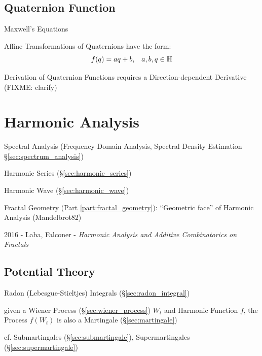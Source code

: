 \subsection{Quaternion Function}\label{sec:quaternion_function}

Maxwell's Equations

Affine Transformations of Quaternions have the form:
\[
  f(q) = aq + b, \;\;\; a,b,q \in \mathbb{H}
\]

Derivation of Quaternion Functions requires a Direction-dependent Derivative
(FIXME: clarify)



\section{Harmonic Analysis}\label{sec:harmonic_analysis}

\fist Spectral Analysis (Frequency Domain Analysis, Spectral Density Estimation
\S\ref{sec:spectrum_analysis})

\fist Harmonic Series (\S\ref{sec:harmonic_series})

\fist Harmonic Wave (\S\ref{sec:harmonic_wave})

\fist Fractal Geometry (Part \ref{part:fractal_geometry}): ``Geometric face'' of
Harmonic Analysis (Mandelbrot82)

2016 - Laba, Falconer - \emph{Harmonic Analysis and Additive Combinatorics on
  Fractals}



\subsection{Potential Theory}\label{sec:potential_theory}

Radon (Lebesgue-Stieltjes) Integrals (\S\ref{sec:radon_integral})

given a Wiener Process (\S\ref{sec:wiener_process}) $W_t$ and Harmonic Function
$f$, the Process $f(W_t)$ is also a Martingale (\S\ref{sec:martingale})

\fist cf. Submartingales (\S\ref{sec:submartingale}), Supermartingales
(\S\ref{sec:supermartingale})



